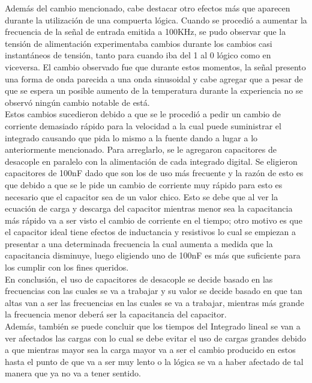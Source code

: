 \documentclass{report}
\begin{document}
Además del cambio mencionado, cabe destacar otro efectos más que aparecen durante la utilización de una compuerta lógica. Cuando se procedió a aumentar la frecuencia de la señal de entrada emitida a 100KHz, se pudo observar que la tensión de alimentación experimentaba cambios durante los cambios casi instantáneos de tensión, tanto para cuando iba del 1 al 0 lógico como en viceversa. El cambio observado fue que durante estos momentos, la señal presento una forma de onda parecida a una onda sinusoidal y cabe agregar que a pesar de que se espera un posible aumento de la temperatura durante la experiencia no se observó ningún cambio notable de está.\\
Estos cambios sucedieron debido a que se le procedió a pedir un cambio de corriente demasiado rápido para la velocidad a la cual puede suministrar el integrado causando que pida lo mismo a la fuente dando a lugar a lo anteriormente mencionado. Para arreglarlo, se le agregaron capacitores de desacople en paralelo con la alimentación de cada integrado digital. Se eligieron capacitores de 100nF dado que son los de uso más frecuente y la razón de esto es que debido a que se le pide un cambio de corriente muy rápido para esto es necesario que el capacitor sea de un valor chico. Esto se debe que al ver la ecuación de carga y descarga del capacitor mientras menor sea la capacitancia más rápido va a ser visto el cambio de corriente en el tiempo; otro motivo es que el capacitor ideal tiene efectos de inductancia y resistivos lo cual se empiezan a presentar a una determinada frecuencia la cual aumenta a medida que la capacitancia disminuye, luego eligiendo uno de 100nF es más que suficiente para los cumplir con los fines queridos.\\
En conclusión, el uso de capacitores de desacople se decide basado en las frecuencias con las cuales se va a trabajar y su valor se decide basado en que tan altas van a ser las frecuencias en las cuales se va a trabajar, mientras más grande la frecuencia menor deberá ser la capacitancia del capacitor.\\
Además, también se puede concluir que los tiempos del Integrado lineal se van a ver afectados las cargas con lo cual se debe evitar el uso de cargas grandes debido a que mientras mayor sea la carga mayor va a ser el cambio producido en estos hasta el punto de que va a ser muy lento o la lógica se va a haber afectado de tal manera que ya no va a tener sentido.\\
\end{document}
